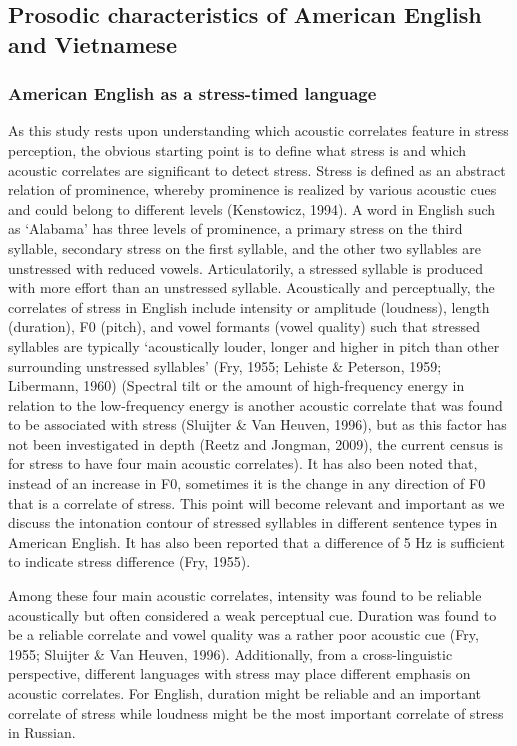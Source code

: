 \documentclass[a4paper]{article}
\begin{document}
\subsection{Prosodic characteristics of American English and Vietnamese}

\subsubsection{American English as a stress-timed language}

As this study rests upon understanding which acoustic correlates feature in stress perception, the obvious starting point is to define what stress is and which acoustic correlates are significant to detect stress. Stress is defined as an abstract relation of prominence, whereby prominence is realized by various acoustic cues and could belong to different levels (Kenstowicz, 1994). A word in English such as `Alabama' has three levels of prominence, a primary stress on the third syllable, secondary stress on the first syllable, and the other two syllables are unstressed with reduced vowels. Articulatorily, a stressed syllable is produced with more effort than an unstressed syllable. Acoustically and perceptually, the correlates of stress in English include intensity or amplitude (loudness), length (duration), F0 (pitch), and vowel formants (vowel quality) such that stressed syllables are typically ‘acoustically louder, longer and higher in pitch than other surrounding unstressed syllables' (Fry, 1955; Lehiste \& Peterson, 1959; Libermann, 1960) (Spectral tilt or the amount of high-frequency energy in relation to the low-frequency energy is another acoustic correlate that was found to be associated with stress (Sluijter \& Van Heuven, 1996), but as this factor has not been investigated in depth (Reetz and Jongman, 2009), the current census is for stress to have four main acoustic correlates). It has also been noted that, instead of an increase in F0, sometimes it is the change in any direction of F0 that is a correlate of stress. This point will become relevant and important as we discuss the intonation contour of stressed syllables in different sentence types in American English. It has also been reported that a difference of 5 Hz is sufficient to indicate stress difference (Fry, 1955).

Among these four main acoustic correlates, intensity was found to be reliable acoustically but often considered a weak perceptual cue. %
Duration was found to be a reliable correlate and vowel quality was a rather poor acoustic cue (Fry, 1955; Sluijter \& Van Heuven, 1996). 
Additionally, from a cross-linguistic perspective, different languages with stress may place different emphasis on acoustic correlates. For English, duration might be reliable and an important correlate of stress while loudness might be the most important correlate of stress in Russian. %
\end{document}
